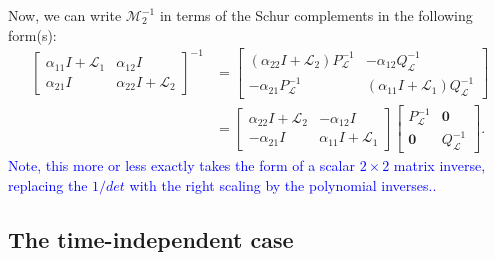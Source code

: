\documentclass[a4paper,10pt]{article}
\newcommand{\tcb}{\textcolor{blue}}
\begin{document}
Now, we can write $\mathcal{M}_2^{-1}$ in terms of the Schur complements in the following form(s):
%
\begin{align}
\begin{bmatrix} \alpha_{11} I + \mathcal{L}_1 & \alpha_{12}I \\ \alpha_{21}I & \alpha_{22}I + \mathcal{L}_2\end{bmatrix} ^{-1}
	& = \begin{bmatrix}  (\alpha_{22} I + \mathcal{L}_2 )P_{\mathcal{L}}^{-1} & -\alpha_{12}Q_{\mathcal{L}}^{-1} \\
		-\alpha_{21}P_{\mathcal{L}}^{-1} & (\alpha_{11} I + \mathcal{L}_1 )Q_{\mathcal{L}}^{-1} \end{bmatrix} \nonumber\\
& = \begin{bmatrix} \alpha_{22} I + \mathcal{L}_2  & -\alpha_{12}I \\ -\alpha_{21}I & \alpha_{11} I + \mathcal{L}_1 \end{bmatrix} 
	\begin{bmatrix} P_{\mathcal{L}}^{-1}  & \mathbf{0} \\ \mathbf{0} & Q_{\mathcal{L}}^{-1} \end{bmatrix}.\label{eq:Minv}
\end{align}
%
\tcb{Note, this more or less exactly takes the form of a scalar $2\times 2$ matrix inverse, replacing
the $1/det$ with the right scaling by the polynomial inverses..}

\subsection{The time-independent case}
\end{document}
